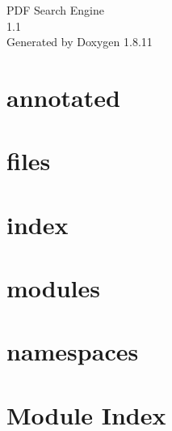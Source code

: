\documentclass[twoside]{book}
\newcommand{\+}{\discretionary{\mbox{\scriptsize$\hookleftarrow$}}{}{}}
\newcommand{\clearemptydoublepage}{%
  \newpage{\pagestyle{empty}\cleardoublepage}%
}
\begin{document}
\begin{titlepage}
\vspace*{7cm}
\begin{center}%
{\Large P\+DF Search Engine \\[1ex]\large 1.\+1 }\\
\vspace*{1cm}
{\large Generated by Doxygen 1.8.11}\\
\end{center}
\end{titlepage}
\clearemptydoublepage
\tableofcontents
\clearemptydoublepage
{}

\chapter{annotated}
\label{md__home_coder_CSE2341-17S-Lose-lose-situation_FProject_Docs_html_annotated}

\chapter{files}
\label{md__home_coder_CSE2341-17S-Lose-lose-situation_FProject_Docs_html_files}

\chapter{index}
\label{md__home_coder_CSE2341-17S-Lose-lose-situation_FProject_Docs_html_index}

\chapter{modules}
\label{md__home_coder_CSE2341-17S-Lose-lose-situation_FProject_Docs_html_modules}

\chapter{namespaces}
\label{md__home_coder_CSE2341-17S-Lose-lose-situation_FProject_Docs_html_namespaces}

\chapter{Module Index}

\end{document}
